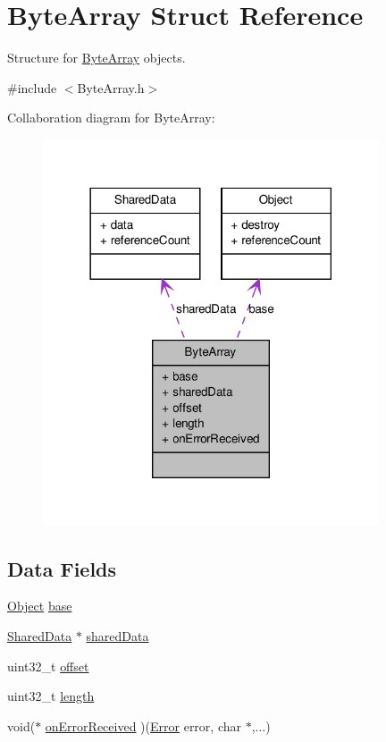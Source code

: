 \hypertarget{struct_byte_array}{
\section{ByteArray Struct Reference}
\label{struct_byte_array}
}


Structure for \hyperlink{struct_byte_array}{ByteArray} objects.  




{\ttfamily \#include $<$ByteArray.h$>$}



Collaboration diagram for ByteArray:\nopagebreak
\begin{figure}[H]
\begin{center}
\leavevmode
\includegraphics[width=282pt]{struct_byte_array__coll__graph}
\end{center}
\end{figure}
\subsection*{Data Fields}
\begin{DoxyCompactItemize}
\item 
\hyperlink{struct_object}{Object} \hyperlink{struct_byte_array_a23cf4ef56ba22bed625eab08d6361fa7}{base}
\item 
\hyperlink{struct_shared_data}{SharedData} $\ast$ \hyperlink{struct_byte_array_a0a0e8cb81138e26f1a3dba7c425f71e1}{sharedData}
\item 
uint32\_\-t \hyperlink{struct_byte_array_a894bdfa2d603d8343f8ef01dda6fcd23}{offset}
\item 
uint32\_\-t \hyperlink{struct_byte_array_aebb70c2aab3407a9f05334c47131a43b}{length}
\item 
void($\ast$ \hyperlink{struct_byte_array_a3c8af4f580f3041d046b7581f89a9695}{onErrorReceived} )(\hyperlink{_constants_8h_a2c3e4bb40f36b262a5214e2da2bca9c5}{Error} error, char $\ast$,...)
\end{DoxyCompactItemize}


